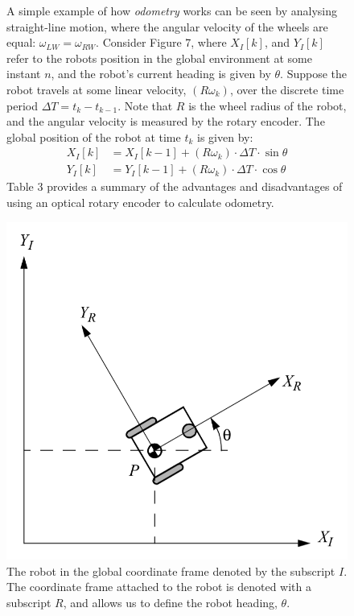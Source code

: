 \documentclass[a4paper]{article}
\begin{document}
\begin{figure}[h]
\begin{minipage}{0.45\textwidth}
A simple example of how \textit{odometry} works can be seen by analysing straight-line motion, where the angular velocity of the wheels are equal: $\omega_{LW} = \omega_{RW}$. Consider Figure 7, where $X_{I}[k]$, and $Y_{I}[k]$ refer to the robots position in the global environment at some instant $n$, and the robot's current heading is given by $\theta$. Suppose the robot travels at some linear velocity, $(R \omega_k)$, over the discrete time period $\Delta T = t_{k} - t_{k-1}$. Note that $R$ is the wheel radius of the robot, and the angular velocity is measured by the rotary encoder. The global position of the robot at time $t_k$ is given by:
\begin{align*}
X_{I}[k] &= X_{I}[k-1] + (R \omega_k)\cdot \Delta T \cdot \sin \theta\\
Y_{I}[k] &= Y_{I}[k-1] + (R \omega_k) \cdot \Delta T \cdot \cos \theta
\end{align*}
Table 3 provides a summary of the advantages and disadvantages of using an optical rotary encoder to calculate odometry.
\end{minipage}
\hspace{1.25cm}
\begin{minipage}{0.45\textwidth}
\centering
\includegraphics[scale=0.2]{odometry}
\caption{The robot in the global coordinate frame denoted by the subscript $I$. The coordinate frame attached to the robot is denoted with a subscript $R$, and allows us to define the robot heading, $\theta$.}
\end{minipage}
\end{figure}
\end{document}
